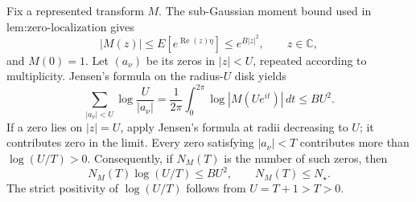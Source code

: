 Fix a represented transform \(M\).  The sub-Gaussian moment bound used in \(\text{lem:zero-localization}\) gives
\[
 |M(z)|\le E[e^{\operatorname{Re}(z)\eta}]
 \le e^{B|z|^2},\qquad z\in\mathbb C,
\]
and \(M(0)=1\).  Let \((a_{\nu})\) be its zeros in \(|z|<U\), repeated according to multiplicity.  Jensen's formula on the radius-\(U\) disk yields
\[
 \sum_{|a_{\nu}|<U}\log\frac{U}{|a_{\nu}|}
 =\frac1{2\pi}\int_0^{2\pi}\log|M(Ue^{it})|\,dt
 \le BU^2.
\]
If a zero lies on \(|z|=U\), apply Jensen's formula at radii decreasing to \(U\); it contributes zero in the limit.  Every zero satisfying \(|a_{\nu}|<T\) contributes more than \(\log(U/T)>0\).  Consequently, if \(N_M(T)\) is the number of such zeros, then
\[
 N_M(T)\log(U/T)\le BU^2,
 \qquad N_M(T)\le N_{\star}.
\]
The strict positivity of \(\log(U/T)\) follows from \(U=T+1>T>0\).